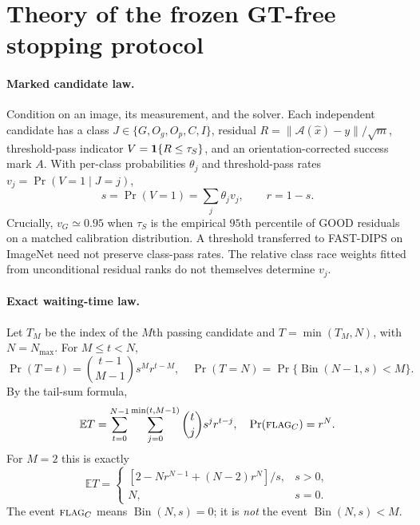 \section{Theory of the frozen GT-free stopping protocol}
\label{sec:suppl-protocol-theory}

\paragraph{Marked candidate law.}
Condition on an image, its measurement, and the solver. Each independent
candidate has a class $J\in\{G,O_g,O_p,C,I\}$, residual
$R=\|\mathcal A(\hat x)-y\|/\sqrt m$, threshold-pass indicator
$V={\bf1}\{R\le\tau_S\}$, and an orientation-corrected success mark $A$.
With per-class probabilities $\theta_j$ and threshold-pass rates
$v_j=\Pr(V=1\mid J=j)$,
\[
 s=\Pr(V=1)=\sum_j\theta_jv_j,\qquad r=1-s.
\]
Crucially, $v_G\simeq0.95$ when $\tau_S$ is the empirical $95$th
percentile of GOOD residuals on a matched calibration distribution.
A threshold transferred to FAST-DIPS on ImageNet need not preserve
class-pass rates. The relative class race weights fitted from unconditional
residual ranks do not themselves determine $v_j$.

\paragraph{Exact waiting-time law.}
Let $T_M$ be the index of the $M$th passing candidate and
$T=\min(T_M,N)$, with $N=N_{\max}$. For $M\le t<N$,
\[
 \Pr(T=t)=\binom{t-1}{M-1}s^M r^{t-M},\quad
 \Pr(T=N)=\Pr\{\operatorname{Bin}(N-1,s)<M\}.
\]
By the tail-sum formula,
\begin{equation}\label{eq:stop-general}
 \mathbb E T=\sum_{t=0}^{N-1}\sum_{j=0}^{\min(t,M-1)}
 \binom tj s^j r^{t-j},\quad
 \Pr(\textsc{flag}_C)=r^N.
\end{equation}
For $M=2$ this is exactly
\begin{equation}\label{eq:stop-M2}
 \mathbb ET=\begin{cases}
 [2-Nr^{N-1}+(N-2)r^N]/s,&s>0,\\
 N,&s=0.
 \end{cases}
\end{equation}
The event $\textsc{flag}_C$ means $\operatorname{Bin}(N,s)=0$;
it is \emph{not} the event $\operatorname{Bin}(N,s)<M$.

